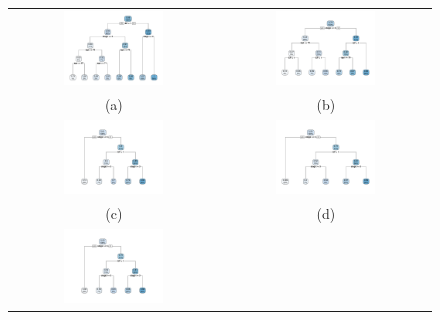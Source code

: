 \documentclass[12pt]{article}
\begin{document}
\begin{figure}
\centering
\begin{tabular}{cc}
   \includegraphics[width=0.5\textwidth]{rpart1_males.pdf}  &
   \includegraphics[width=0.5\textwidth]{rpart10_males.pdf} \\
   (a) & (b) \\
   \includegraphics[width=0.5\textwidth]{rpart20_males.pdf} & 
   \includegraphics[width=0.5\textwidth]{rpart30_males.pdf} \\
   (c) & (d) \\
   \includegraphics[width=0.5\textwidth]{rpart40_males.pdf} & \\

\end{tabular}
\end{figure}
\end{document}
